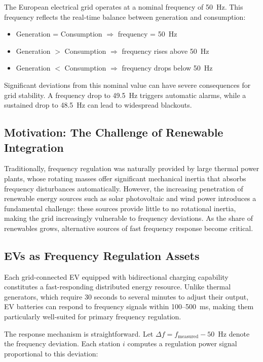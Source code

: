 \documentclass[review]{elsarticle}
\begin{document}
The European electrical grid operates at a nominal frequency of 50~Hz. 
This frequency reflects the real-time balance between generation and consumption:

\begin{itemize}
    \item Generation = Consumption $\Rightarrow$ frequency = 50~Hz
    \item Generation $>$ Consumption $\Rightarrow$ frequency rises above 50~Hz
    \item Generation $<$ Consumption $\Rightarrow$ frequency drops below 50~Hz
\end{itemize}

Significant deviations from this nominal value can have severe consequences 
for grid stability. A frequency drop to 49.5~Hz triggers automatic alarms, 
while a sustained drop to 48.5~Hz can lead to widespread blackouts.

\subsection{Motivation: The Challenge of Renewable Integration}

Traditionally, frequency regulation was naturally provided by large thermal 
power plants, whose rotating masses offer significant mechanical inertia that 
absorbs frequency disturbances automatically. However, the increasing 
penetration of renewable energy sources such as solar photovoltaic and wind 
power introduces a fundamental challenge: these sources provide little to no 
rotational inertia, making the grid increasingly vulnerable to frequency 
deviations. As the share of renewables grows, alternative sources of fast 
frequency response become critical.

\subsection{EVs as Frequency Regulation Assets}

Each grid-connected EV equipped with bidirectional charging capability 
constitutes a fast-responding distributed energy resource. Unlike thermal 
generators, which require 30 seconds to several minutes to adjust their output, 
EV batteries can respond to frequency signals within 100--500~ms, making them 
particularly well-suited for primary frequency regulation.

The response mechanism is straightforward. Let $\Delta f = f_{\text{measured}} 
- 50$~Hz denote the frequency deviation. Each station $i$ computes a 
regulation power signal proportional to this deviation:
\end{document}
